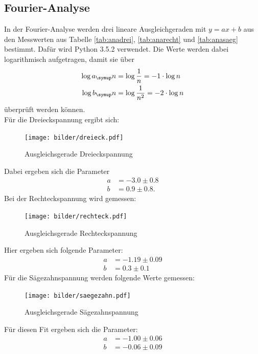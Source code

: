 \subsection{Fourier-Analyse}
In der Fourier-Analyse werden drei lineare Ausgleichgeraden mit $y = ax + b$ aus den Messwerten
aus Tabelle \ref{tab:anadrei}, \ref{tab:anarecht} und \ref{tab:anasaeg} bestimmt.
Dafür wird Python 3.5.2 verwendet. Die Werte werden dabei logarithmisch aufgetragen,
damit sie über
\begin{align}
  \log{a_\su{n}} &= \log{\frac{1}{n}} = -1\cdot \log{n} \\
  \log{b_\su{n}} &= \log{\frac{1}{n^2}} = -2\cdot \log{n} \\ \label{eqn:fehler}
\end{align}
überprüft werden können. \\
Für die Dreieckspannung ergibt sich:

\begin{figure}[!h]
  \centering
  \texttt{[image: bilder/dreieck.pdf]}
  \caption{Ausgleichsgerade Dreieckspannung}
  \label{fig:fitdrei}
\end{figure}
\par
Dabei ergeben sich die Parameter
\begin{align*}
  a &= -3.0 ± 0.8 \\
  b &= 0.9 ± 0.8.
\end{align*}
\newpage
Bei der Rechteckspannung wird gemessen:

\begin{figure}[!h]
  \centering
  \texttt{[image: bilder/rechteck.pdf]}
  \caption{Ausgleichsgerade Rechteckspannung}
  \label{fig:fitrecht}
\end{figure}
\par
Hier ergeben sich folgende Parameter:
\begin{align*}
  a &= -1.19 ± 0.09 \\
  b &= 0.3 ± 0.1
\end{align*}
\newpage
Für die Sägezahnspannung werden folgende Werte gemessen:

\begin{figure}[!h]
  \centering
  \texttt{[image: bilder/saegezahn.pdf]}
  \caption{Ausgleichsgerade Sägezahnspannung}
  \label{fig:fitsäge}
\end{figure}
\par
Für diesen Fit ergeben sich die Parameter:
\begin{align*}
  a &= -1.00 ± 0.06 \\
  b &= -0.06 ± 0.09
\end{align*}

